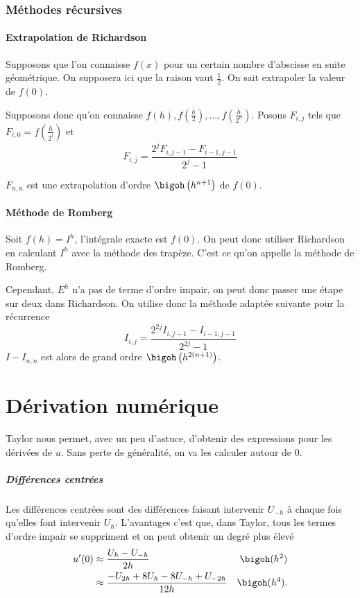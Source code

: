 \section{Méthodes récursives}
\subsection{Extrapolation de Richardson}
Supposons que l'on connaisse $f(x)$ pour un certain nombre d'abscisse en
suite géométrique. On supposera ici que la raison vaut $\frac{1}{2}$.
On sait extrapoler la valeur de $f(0)$.

Supposons donc qu'on connaisse
$f(h), f\left(\frac{h}{2}\right), \ldots, f\left(\frac{h}{2^n}\right)$.
Posons
$F_{i, j}$ tels que $F_{i, 0} = f\left(\frac{h}{2^i}\right)$ et
\[ F_{i, j} = \frac{2^j F_{i, j-1} - F_{i-1, j-1}}{2^j - 1} \]

$F_{n, n}$ est une extrapolation d'ordre
$\bigoh\left(h^{n+1}\right)$ de $f(0)$.

\subsection{Méthode de Romberg}
Soit $f(h) = I^h$, l'intégrale exacte est $f(0)$.
On peut donc utiliser Richardson en calculant
$I^h$ avec la méthode des trapèze.
C'est ce qu'on appelle la méthode de Romberg.

Cependant, $E^h$ n'a pas de terme d'ordre impair, on peut donc passer
une étape sur deux dans Richardson.
On utilise donc la méthode adaptée suivante pour la récurrence
\[ I_{i, j} = \frac{2^{2j} I_{i, j-1} - I_{i-1, j-1}}{2^{2j} - 1} \]
$I - I_{n, n}$ est alors de grand ordre $\bigoh\left(h^{2(n+1)}\right)$.

\part{Dérivation numérique}
Taylor nous permet, avec un peu d'astuce, d'obtenir des
expressions pour les dérivées de $u$.
Sans perte de généralité, on va les calculer autour de 0.

\subsubsection{Différences centrées}
Les différences centrées sont des différences faisant
intervenir $U_{-h}$ à chaque fois qu'elles font intervenir $U_{h}$.
L'avantages c'est que, dans Taylor, tous les termes d'ordre impair
se suppriment et on peut obtenir un degré plus élevé
\begin{align*}
  u'(0) & \approx \frac{U_h - U_{-h}}{2h} & \bigoh(h^2)\\
  & \approx \frac{-U_{2h} + 8U_h - 8U_{-h} + U_{-2h}}{12h} & \bigoh(h^4).
\end{align*}

